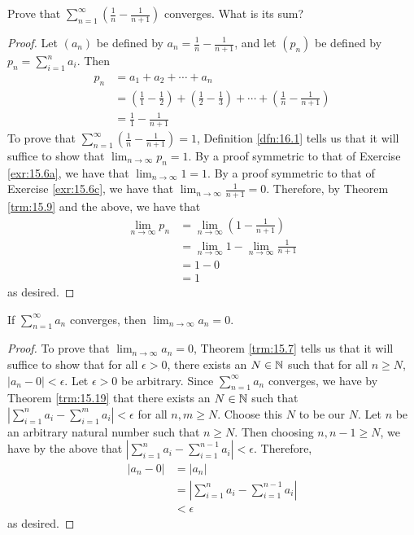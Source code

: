 \documentclass[../main.tex]{subfiles}
\begin{document}
\begin{exercise}\label{exr:16.3}
    Prove that $\sum_{n=1}^\infty(\frac{1}{n}-\frac{1}{n+1})$ converges. What is its sum?
    \begin{proof}
        Let $(a_n)$ be defined by $a_n=\frac{1}{n}-\frac{1}{n+1}$, and let $(p_n)$ be defined by $p_n=\sum_{i=1}^na_i$. Then
        \begin{align*}
            p_n &= a_1+a_2+\cdots+a_n\\
            &= \left( \frac{1}{1}-\frac{1}{2} \right)+\left( \frac{1}{2}-\frac{1}{3} \right)+\cdots+\left( \frac{1}{n}-\frac{1}{n+1} \right)\\
            &= \frac{1}{1}-\frac{1}{n+1}
        \end{align*}
        To prove that $\sum_{n=1}^\infty(\frac{1}{n}-\frac{1}{n+1})=1$, Definition \ref{dfn:16.1} tells us that it will suffice to show that $\lim_{n\to\infty}p_n=1$. By a proof symmetric to that of Exercise \ref{exr:15.6a}, we have that $\lim_{n\to\infty}1=1$. By a proof symmetric to that of Exercise \ref{exr:15.6c}, we have that $\lim_{n\to\infty}\frac{1}{n+1}=0$. Therefore, by Theorem \ref{trm:15.9} and the above, we have that
        \begin{align*}
            \lim_{n\to\infty}p_n &= \lim_{n\to\infty}\left( 1-\frac{1}{n+1} \right)\\
            &= \lim_{n\to\infty}1-\lim_{n\to\infty}\frac{1}{n+1}\\
            &= 1-0\\
            &= 1
        \end{align*}
        as desired.
    \end{proof}
\end{exercise}

\begin{theorem}\label{trm:16.4}
    If $\sum_{n=1}^\infty a_n$ converges, then $\lim_{n\to\infty}a_n=0$.
    \begin{proof}
        To prove that $\lim_{n\to\infty}a_n=0$, Theorem \ref{trm:15.7} tells us that it will suffice to show that for all $\epsilon>0$, there exists an $N\in\mathbb{N}$ such that for all $n\geq N$, $|a_n-0|<\epsilon$. Let $\epsilon>0$ be arbitrary. Since $\sum_{n=1}^\infty a_n$ converges, we have by Theorem \ref{trm:15.19} that there exists an $N\in\mathbb{N}$ such that $|\sum_{i=1}^na_i-\sum_{i=1}^ma_i|<\epsilon$ for all $n,m\geq N$. Choose this $N$ to be our $N$. Let $n$ be an arbitrary natural number such that $n\geq N$. Then choosing $n,n-1\geq N$, we have by the above that $|\sum_{i=1}^na_i-\sum_{i=1}^{n-1}a_i|<\epsilon$. Therefore,
        \begin{align*}
            |a_n-0| &= |a_n|\\
            &= \left| \sum_{i=1}^na_i-\sum_{i=1}^{n-1}a_i \right|\\
            &< \epsilon
        \end{align*}
        as desired.
    \end{proof}
\end{theorem}
\end{document}
